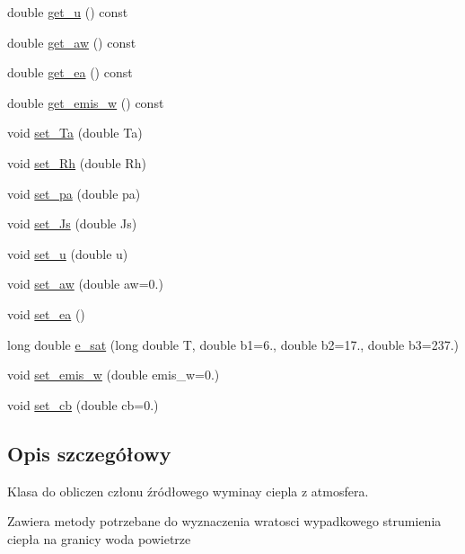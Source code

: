 \begin{DoxyCompactItemize}
\item 
double \hyperlink{class_net_heat_flux_ad5d42768c59f90e629dd033a6fd1ac77}{get\+\_\+u} () const 
\item 
double \hyperlink{class_net_heat_flux_a1f7f06ac4ad2d3e71a2c9c7203ffc833}{get\+\_\+aw} () const 
\item 
double \hyperlink{class_net_heat_flux_a1a1c94edb55d10722782ac1e76f1c8b8}{get\+\_\+ea} () const 
\item 
double \hyperlink{class_net_heat_flux_ab48ea591c24a62581348cc291d565076}{get\+\_\+emis\+\_\+w} () const 
\item 
void \hyperlink{class_net_heat_flux_a9e9700acebfa6481f24b93c2f7d1efd6}{set\+\_\+\+Ta} (double Ta)
\item 
void \hyperlink{class_net_heat_flux_a870e6db2db832d88f88a0f75516f39d7}{set\+\_\+\+Rh} (double Rh)
\item 
void \hyperlink{class_net_heat_flux_ac4d58893c28e07cd05a7988d098df46b}{set\+\_\+pa} (double pa)
\item 
void \hyperlink{class_net_heat_flux_a4608ba4ec5bade409d066b9e2370a4a0}{set\+\_\+\+Js} (double Js)
\item 
void \hyperlink{class_net_heat_flux_ac4c880ee001af382d098191843b4fafb}{set\+\_\+u} (double u)
\item 
void \hyperlink{class_net_heat_flux_a4f17f1801cbea3b76715fdc873be78b6}{set\+\_\+aw} (double aw=0.)
\item 
void \hyperlink{class_net_heat_flux_ae90ff0b43ec0e41e2f40f28df7c9612d}{set\+\_\+ea} ()
\item 
long double \hyperlink{class_net_heat_flux_a3baa4ec5f1504d7e5c01efd21530637f}{e\+\_\+sat} (long double T, double b1=6., double b2=17., double b3=237.)
\item 
void \hyperlink{class_net_heat_flux_ac6c12bccd613d87ffae5a90b4910eaeb}{set\+\_\+emis\+\_\+w} (double emis\+\_\+w=0.)
\item 
void \hyperlink{class_net_heat_flux_ae127a9c31f1bd777f40b9034395d4f96}{set\+\_\+cb} (double cb=0.)
\end{DoxyCompactItemize}


\subsection{Opis szczegółowy}
Klasa do obliczen członu źródłowego wyminay ciepla z atmosfera. 

Zawiera metody potrzebane do wyznaczenia wratosci wypadkowego strumienia ciepła na granicy woda powietrze 

